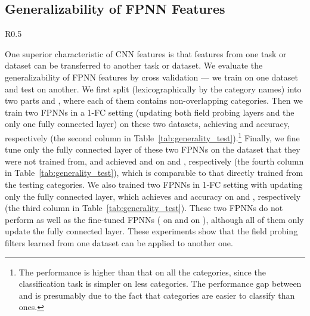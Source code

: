 \documentclass{article}
\begin{document}
\subsection{Generalizability of FPNN Features}
\begin{wraptable}{R}{0.5\linewidth}
\vspace{-2.1cm}
\begin{center}
\end{center}
\vspace{-0.3cm}
\caption{Generalizability test of FPNN features.}
\label{tab:generality_test}
\vspace{-0.4cm}
\end{wraptable}
One superior characteristic of CNN features is that features from one task or dataset can be transferred to another task or dataset. We evaluate the generalizability of FPNN features by cross validation --- we train on one dataset and test on another. We first split  (lexicographically by the category names) into two parts  and , where each of them contains  non-overlapping categories. Then we train two FPNNs in a 1-FC setting (updating both field probing layers and the only one fully connected layer) on these two datasets, achieving  and  accuracy, respectively (the second column in Table~\ref{tab:generality_test}).\footnote{The performance is higher than that on all the  categories, since the classification task is simpler on less categories. The performance gap between  and  is presumably due to the fact that  categories are easier to classify than  ones.} Finally, we fine tune only the fully connected layer of these two FPNNs on the dataset that they were not trained from, and achieved  and  on  and , respectively (the fourth column in Table~\ref{tab:generality_test}), which is comparable to that directly trained from the testing categories. We also trained two FPNNs in 1-FC setting with updating only the fully connected layer, which achieves  and  accuracy on  and , respectively (the third column in Table~\ref{tab:generality_test}). These two FPNNs do not perform as well as the fine-tuned FPNNs ( on  and  on ), although all of them only update the fully connected layer. These experiments show that the field probing filters learned from one dataset can be applied to another one. 
\end{document}
